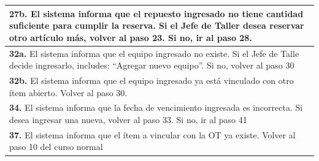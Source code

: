 \documentclass[12pt]{extarticle}
\begin{document}
\begin{spacing}{1.2}
\begin{longtable}{ |p{8cm}|p{8cm}| }
            \hline
            \multicolumn{2}{|p{16cm}|}{\textbf{27b. }El sistema informa que el repuesto ingresado no tiene cantidad suficiente para cumplir la reserva. Si el Jefe de Taller desea reservar otro artículo más, volver al paso 23. Si no, ir al paso 28.}\\
            \hline
            \multicolumn{2}{|p{16cm}|}{\textbf{32a. }El sistema informa que el equipo ingresado no existe. Si el Jefe de Talle decide ingresarlo, includes: ``Agregar nuevo equipo''. Si no, volver al paso 30}\\
            \hline
            \multicolumn{2}{|p{16cm}|}{\textbf{32b. }El sistema informa que el equipo ingresado ya está vinculado con otro ítem abierto. Volver al paso 30.}\\
            \hline
            \multicolumn{2}{|p{16cm}|}{\textbf{34. }El sistema informa que la fecha de vencimiento ingresada es incorrecta. Si desea ingresar una nueva, volver al paso 33. Si no, ir al paso 41}\\
            \hline  
            \multicolumn{2}{|p{16cm}|}{\textbf{37. }El sistema informa que el ítem a vincular con la OT ya existe. Volver al paso 10 del curso normal}\\
        \hline  
    \end{longtable}



    \setcounter{step}{0}



\end{spacing}
\end{document}
